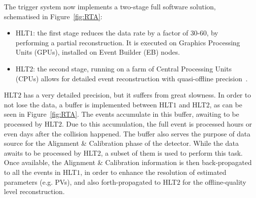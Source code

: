 The trigger system now implements a two-stage full software solution, schematised in Figure~\ref{fig:RTA}:
\begin{itemize}
\item HLT$1$: the first stage reduces the data rate by a factor of 30-60, by performing a partial reconstruction. It is executed on Graphics Processing Units (GPUs), installed on Event Builder (EB) nodes.
\item HLT$2$: the second stage, running on a farm of Central Processing Units (CPUs) allows for detailed event reconstruction with quasi-offline precision~\cite{Gazzoni:2670650}.
\end{itemize}
HLT$2$ has a very detailed precision, but it suffers from great slowness. In order to not lose the data, a buffer is implemented between HLT$1$ and HLT$2$, as can be seen in Figure~\ref{fig:RTA}. The events accumulate in this buffer, awaiting to be processed by HLT$2$. Due to this accumulation, the full event is processed hours or even days after the collision happened. 
The buffer also serves the purpose of data source for the Alignment \& Calibration phase of the detector. While the data awaits to be processed by HLT$2$, a subset of them is used to perform this task. Once available, the Alignment \& Calibration information is then back-propagated to all the events in HLT$1$, in order to enhance the resolution of estimated parameters (e.g. PVs), and also forth-propagated to HLT$2$ for the offline-quality level reconstruction.



